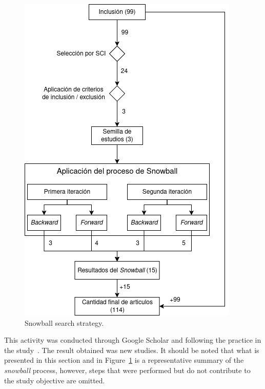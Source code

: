\begin{figure}[htbp]
	\centering
	\includegraphics[scale=0.55]{resources/figures/sms-Snowball.drawio.png}
	\caption{Snowball search strategy.}
	\label{figure:Snowball}
\end{figure}

This activity was conducted through Google Scholar and following the practice in the study~\cite{Ali-01}. The result obtained was \snowballNewStudies{} new studies. It should be noted that what is presented in this section and in Figure~\ref{figure:Snowball} is a representative summary of the \textit{snowball} process, however, steps that were performed but do not contribute to the study objective are omitted.

